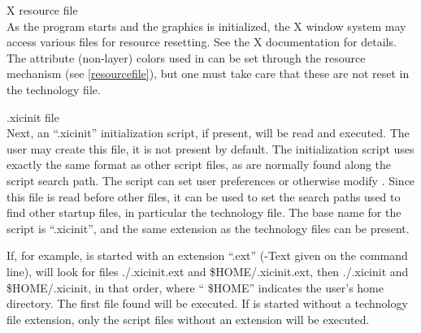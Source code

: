 \begin{description}

\item{X resource file}\\
As the program starts and the graphics is initialized, the X window
system may access various files for resource resetting.  See the X
documentation for details.  The attribute (non-layer) colors used in
{\Xic} can be set through the resource mechanism (see
\ref{resourcefile}), but one must take care that these are not reset
in the technology file.

\item{{\vt .xicinit} file}\\
Next, an ``{\vt .xicinit}'' initialization script, if present, will be
read and executed.  The user may create this file, it is not present
by default.  The initialization script uses exactly the same format as
other script files, as are normally found along the script search
path.  The script can set user preferences or otherwise modify {\Xic}. 
Since this file is read before other files, it can be used to set the
search paths used to find other startup files, in particular the
technology file.  The base name for the script is ``{\vt .xicinit}'',
and the same extension as the technology files can be present.

If, for example, {\Xic} is started with an extension ``{\vt .ext}''
({\et -Text} given on the command line), {\Xic} will look for files
{\vt ./.xicinit.ext} and {\vt \$HOME/.xicinit.ext}, then {\vt
./.xicinit} and {\vt \$HOME/.xicinit}, in that order, where ``{\vt
\$HOME}'' indicates the user's home directory.  The first file found
will be executed.  If {\Xic} is started without a technology file
extension, only the script files without an extension will be
executed.


\end{description}

